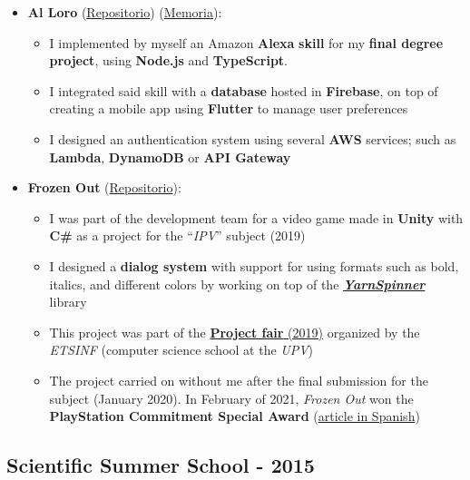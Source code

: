 \documentclass[letterpaper, 12pt, dvipsnames]{article}
\begin{document}
\begin{itemize}
    \item \textbf{Al Loro} (\href{https://github.com/algono/FeedTheParrot-RSS}{Repositorio}) (\href{http://hdl.handle.net/10251/174256}{Memoria}):
          \begin{itemize}
              \item I implemented by myself an Amazon \textbf{Alexa} \textbf{skill} for my \textbf{final degree project}, using \textbf{Node.js} and \textbf{TypeScript}.
              \item I integrated said skill with a \textbf{database} hosted in \textbf{Firebase}, on top of creating a mobile app using \textbf{Flutter} to manage user preferences
              \item I designed an authentication system using several \textbf{AWS} services; such as \textbf{Lambda}, \textbf{DynamoDB} or \textbf{API Gateway}
          \end{itemize}
    \item \textbf{Frozen Out} (\href{https://github.com/Freezer-Games/Frozen-Out}{Repositorio}):
          \begin{itemize}
              \item I was part of the development team for a video game made in \textbf{Unity} with \textbf{C\#} as a project for the ``\emph{IPV}'' subject (2019)
              \item I designed a \textbf{dialog system} with support for using formats such as bold, italics, and different colors by working on top of the \href{https://yarnspinner.dev/}{\textbf{\emph{YarnSpinner}}} library
              \item This project was part of the \href{https://es-es.facebook.com/etsinf/videos/feria-de-proyectos-de-estudiantes-2019/1921312964681641/}{\textbf{Project fair} (2019)} organized by the \emph{ETSINF} (computer science school at the \emph{UPV})
              \item The project carried on without me after the final submission for the subject (January 2020). In February of 2021, \emph{Frozen Out} won the \textbf{PlayStation Commitment Special Award} (\href{https://www.inf.upv.es/www/etsinf/es/premio-especial-compromiso-playstation-para-el-videojuego-frozen-out-creado-por-estudiantes-de-la-etsinf-y-la-facultat-de-bb-aa/}{article in Spanish})
          \end{itemize}
\end{itemize}

\subsection*{Scientific Summer School - 2015}
\end{document}
